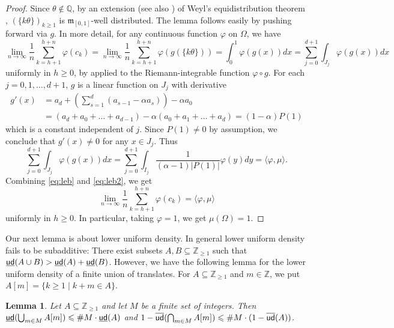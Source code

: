 \documentclass[12pt,centertags,oneside]{amsart}
\newtheorem{lemma}[theorem]{Lemma}
\theoremstyle{definition}
\newcommand{\bQ}{\mathbb{Q}}
\newcommand{\mleb}{\mathfrak{m}}
\newcommand{\Z}{\mathbb{Z}}
\newcommand{\lden}{\underline{\sf ud}}
\newcommand{\uden}{\overline{\sf ud}}
\renewcommand{\le}{\leqslant}
\renewcommand{\ge}{\geqslant}
\begin{document}
\begin{proof} 
Since $\theta\notin \bQ$, by an extension \cite{Petersen} (see also 
\cite[Chapter~1, Example 5.2]{KN}) of Weyl's equidistribution theorem 
\cite[Satz~2]{Weyl}, $(\{k\theta\})_{k\ge 1}$ is $\mleb_{[0,1]}$-well 
distributed. The lemma follows easily by pushing forward via $g$. In more 
detail, for any continuous function $\varphi$ on $\Omega$, we have 
\begin{equation}\label{eq:leb} 
\lim_{n \to \infty} \frac{1}{n} \sum_{k=h+1}^{h+n} \varphi ( c_k )  = 
\lim_{n \to \infty}\frac{1}{n} \sum_{k=h+1}^{h+n} \varphi\left(g ( \{ k\theta   \}   ) \right)
=\int_{0}^{1}\varphi\left(g(x)\right)dx = \sum\limits_{j=0}^{d+1} \int_{J_j} 
\varphi\left(g(x)\right)dx 
\end{equation}
uniformly in $h\ge 0$, by \cite[Theorem~2]{Petersen} applied to the 
Riemann-integrable function $\varphi\circ g$. For each $j=0,1,\dots,d+1$, 
$g$ is a linear function on $J_j$ with derivative 
\begin{align*}
g'(x)&=a_d+\left(\sum\limits_{s=1}^{d}(a_{s-1}-\alpha a_s)\right)-\alpha a_0\\
&=(a_d+a_0+\dots+a_{d-1})-\alpha(a_0+a_1+\dots+a_d)=(1-\alpha)P(1)
\end{align*}
which is a constant independent of $j$. Since $P(1)\neq 0$ by assumption, 
we conclude that $g'(x)\neq 0$ for any $x\in J_j$. Thus 
\begin{equation}\label{eq:leb2}
\sum\limits_{j=0}^{d+1} \int_{J_j} \varphi\left(g(x)\right)dx = 
\sum\limits_{j=0}^{d+1} \int_{I_j}\frac{1}{(\alpha-1)\lvert P(1)\rvert} \varphi(y)dy=
\langle\varphi,\mu\rangle.
\end{equation}
Combining \eqref{eq:leb} and \eqref{eq:leb2}, we get
\[\lim_{n \to \infty} \frac{1}{n} \sum_{k=h+1}^{h+n} \varphi ( c_k )  = \langle\varphi,\mu\rangle\]
uniformly in $h\ge 0$. In particular, taking $\varphi=1$, we get 
$\mu(\Omega)=1$. 
\end{proof}

Our next lemma is about lower uniform density. In general lower uniform 
density fails to be subadditive: There exist subsets $A,B\subseteq \Z_{\ge 
1}$ such that $\lden(A\cup B)>\lden(A)+ \lden(B)$. However, we have the 
following lemma for the lower uniform density of a finite union of 
translates. For $A\subseteq \Z_{\ge 1}$ and $m\in \Z$, we put $A[m]=\{k\ge 
1\mid k+m\in A\}$. 

\begin{lemma}\label{l:upper-den}
Let $A\subseteq\mathbb{Z}_{\geqslant1}$ and let $M$ be a finite set of 
integers. Then $\lden(\bigcup_{m\in M}A[m]) \le \#M\cdot \lden(A)$ and 
$1-\uden(\bigcap_{m\in M}A[m]) \le \#M\cdot (1- \uden(A))$. 
\end{lemma}
\end{document}
